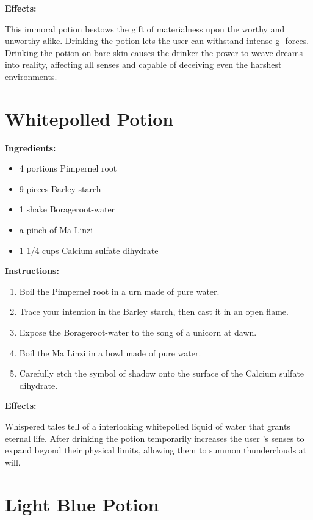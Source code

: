 \documentclass{article}
\begin{document}
\textbf{Effects:}

This immoral potion bestows the gift of materialness upon the worthy and unworthy alike. Drinking the potion lets the user can withstand intense g- forces. Drinking the potion on bare skin causes the drinker the power to weave dreams into reality, affecting all senses and capable of deceiving even the harshest environments.

\newpage
\section*{Whitepolled Potion}

\textbf{Ingredients:}

\begin{itemize}
  \item 4 portions Pimpernel root
  \item 9 pieces Barley starch
  \item 1 shake Borageroot-water
  \item a pinch of Ma Linzi
  \item 1 1/4 cups Calcium sulfate dihydrate
\end{itemize}

\textbf{Instructions:}

\begin{enumerate}
  \item Boil the Pimpernel root in a urn made of pure water.
  \item Trace your intention in the Barley starch, then cast it in an open flame.
  \item Expose the Borageroot-water to the song of a unicorn at dawn.
  \item Boil the Ma Linzi in a bowl made of pure water.
  \item Carefully etch the symbol of shadow onto the surface of the Calcium sulfate dihydrate.
\end{enumerate}

\textbf{Effects:}

Whispered tales tell of a interlocking whitepolled liquid of water that grants eternal life. After drinking the potion temporarily increases the user 's senses to expand beyond their physical limits, allowing them to summon thunderclouds at will.

\newpage
\section*{Light Blue Potion}
\end{document}
